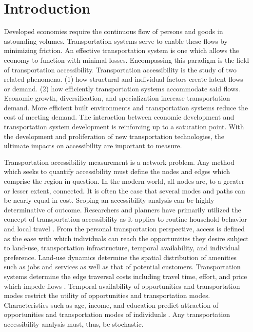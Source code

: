 \section*{Introduction}

Developed economies require the continuous flow of persons and goods in astounding volumes. Transportation systems serve to enable these flows by minimizing friction. An effective transportation system is one which allows the economy to function with minimal losses. Encompassing this paradigm is the field of transportation accessibility. Transportation accessibility is the study of two related phenomena. (1) how structural and individual factors create latent flows or demand. (2) how efficiently transportation systems accommodate said flows. Economic growth, diversification, and specialization increase transportation demand. More efficient built environments and transportation systems reduce the cost of meeting demand. The interaction between economic development and transportation system development is reinforcing up to a saturation point. With the development and proliferation of new transportation technologies, the ultimate impacts on accessibility are important to measure.

Transportation accessibility measurement is a network problem. Any method which seeks to quantify accessibility must define the nodes and edges which comprise the region in question. In the modern world, all nodes are, to a greater or lesser extent, connected. It is often the case that several modes and paths can be nearly equal in cost. Scoping an accessibility analysis can be highly determinative of outcome. Researchers and planners have primarily utilized the concept of transportation accessibility as it applies to routine household behavior and local travel \cite{Handy_2020}. From the personal transportation perspective, access is defined as the ease with which individuals can reach the opportunities they desire subject to land-use, transportation infrastructure, temporal availability, and individual preference. Land-use dynamics determine the spatial distribution of amenities such as jobs and services as well as that of potential customers. Transportation systems determine the edge traversal costs including travel time, effort, and price which impede flows \cite{Geurs_2004}. Temporal availability of opportunities and transportation modes restrict the utility of opportunities and transportation modes. Characteristics such as age, income, and education predict attraction of opportunities and transportation modes of individuals \cite{Miller_2018}. Any transportation accessibility analysis must, thus, be stochastic.

